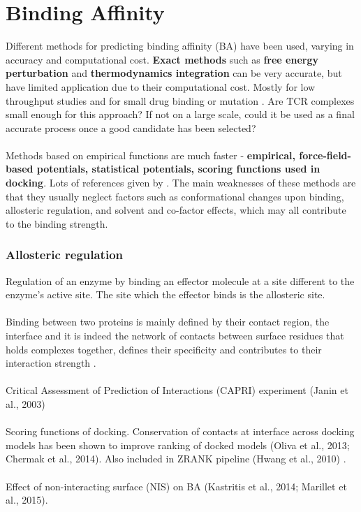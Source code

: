 	
	\flushbottom %
	
	\maketitle %

	\thispagestyle{empty} %

\section{Binding Affinity}

Different methods for predicting binding affinity (BA) have been used, varying in accuracy and computational cost. \textbf{Exact methods} such as \textbf{free energy perturbation} and \textbf{thermodynamics integration} can be very accurate, but have limited application due to their computational cost. Mostly for low throughput studies and for small drug binding or mutation \cite{Vangone2015}. Are TCR complexes small enough for this approach? If not on a large scale, could it be used as a final accurate process once a good candidate has been selected? 
\\
\\
Methods based on empirical functions are much faster - \textbf{empirical, force-field-based potentials, statistical potentials, scoring functions used in docking}. Lots of references given by \cite{Vangone2015}. The main weaknesses of these methods are that they usually neglect factors such as conformational changes upon binding, allosteric regulation, and solvent and co-factor effects, which may all contribute to the binding strength.

\subsubsection{Allosteric regulation}
Regulation of an enzyme by binding an effector molecule at a site different to the enzyme's active site. The site which the effector binds is the allosteric site.
\\ \\
Binding between two proteins is mainly defined by their contact region, the interface and it is indeed the network of contacts between surface residues that holds complexes together, defines their specificity and contributes to their interaction strength \cite{Vangone2015}.
\\
\\
\research Critical Assessment of Prediction of Interactions (CAPRI) experiment (Janin et al., 2003)
\\
\\
\research Scoring functions of docking. Conservation of contacts at interface across docking models has been shown to improve ranking of docked models (Oliva et al., 2013; Chermak et al., 2014). Also included in ZRANK pipeline (Hwang et al., 2010) \cite{Vangone2015}.
\\
\\
\research Effect of non-interacting surface (NIS) on BA  (Kastritis et al., 2014; Marillet et al., 2015).		




